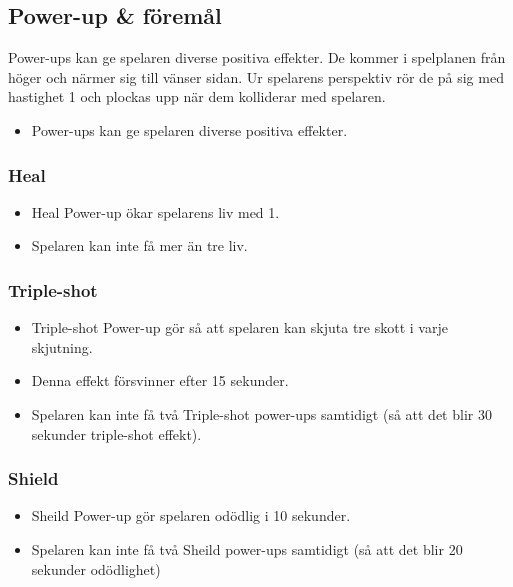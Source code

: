 \documentclass{TDP005mall}
\begin{document}
\subsection{Power-up \& föremål}
Power-ups kan ge spelaren diverse positiva effekter. De kommer i spelplanen från höger och närmer sig till vänser sidan. Ur spelarens perspektiv rör de på sig med hastighet 1 och plockas upp när dem kolliderar med spelaren.

\begin{itemize}
\item Power-ups kan ge spelaren diverse positiva effekter.
\end{itemize}

\subsubsection*{Heal}
\begin{itemize}
\item Heal Power-up ökar spelarens liv med 1.
\item Spelaren kan inte få mer än tre liv.
  
\end{itemize}

\subsubsection*{Triple-shot}
\begin{itemize}
\item Triple-shot Power-up gör så att spelaren kan skjuta tre skott i varje skjutning.
\item Denna effekt försvinner efter 15 sekunder.
\item Spelaren kan inte få två Triple-shot power-ups samtidigt (så att det blir 30 sekunder triple-shot effekt).
\end{itemize}

\subsubsection*{Shield}
\begin{itemize}
\item Sheild Power-up gör spelaren odödlig i 10 sekunder.
\item Spelaren kan inte få två Sheild power-ups samtidigt (så att det blir 20 sekunder odödlighet)
\end{itemize}
\end{document}
